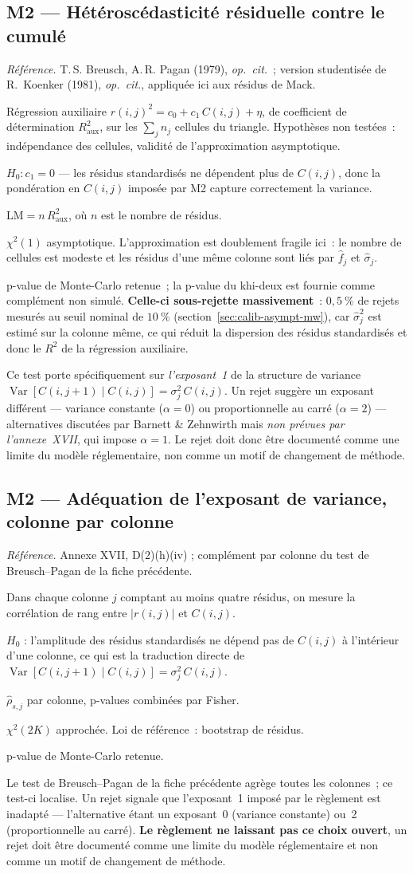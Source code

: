 \documentclass[a4paper,11pt]{article}
\newcommand{\refl}[1]{{\small\textcolor{maincolor!70!black}{\textit{Référence.} #1}}\par\smallskip}
\newcounter{ficheid}
\newenvironment{fiche}[1]{%
  \stepcounter{ficheid}%
  \phantomsection
  \subsection{#1}%
  \label{fiche:\theficheid}%
}{%
  \end{description}\vspace{0.5em}%
}
\newcommand{\Cadre}{%
  \begin{description}[leftmargin=0pt, style=unboxed, itemsep=3pt, topsep=3pt, parsep=2pt]%
  \item[\textcolor{financeblue}{\textbf{1. Cadre, notations et hypothèses de validité (non testées).}}]}
\newcommand{\Hzero}{\item[\textcolor{financeblue}{\textbf{2. Hypothèse nulle.}}]}
\newcommand{\Stat}{\item[\textcolor{financeblue}{\textbf{3. Statistique de test.}}]}
\newcommand{\Loi}{\item[\textcolor{financeblue}{\textbf{4. Loi sous $H_0$.}}]}
\newcommand{\Pval}{\item[\textcolor{financeblue}{\textbf{5. p-value.}}]}
\newcommand{\Usage}{\item[\textcolor{financeblue}{\textbf{6. Usage et limites.}}]}
\begin{document}
\begin{fiche}{M2 --- Hétéroscédasticité résiduelle contre le cumulé}
\label{mw:m2bp}
\refl{T.\,S. Breusch, A.\,R. Pagan (1979), \emph{op.\ cit.}~; version
studentisée de R.~Koenker (1981), \emph{op.\ cit.}, appliquée ici aux résidus de
Mack.}
\Cadre
Régression auxiliaire $r(i,j)^2 = c_0 + c_1\,C(i,j) + \eta$, de coefficient de
détermination $R^2_{\text{aux}}$, sur les $\sum_j n_j$ cellules du triangle.
Hypothèses non testées~: indépendance des cellules, validité de l'approximation
asymptotique.
\Hzero
$H_0 : c_1 = 0$ --- les résidus standardisés ne dépendent plus de $C(i,j)$, donc
la pondération en $C(i,j)$ imposée par M2 capture correctement la variance.
\Stat
$\mathrm{LM} = n\,R^2_{\text{aux}}$, où $n$ est le nombre de résidus.
\Loi
$\chi^2(1)$ asymptotique. L'approximation est doublement fragile ici~: le nombre
de cellules est modeste et les résidus d'une même colonne sont liés par
$\hat f_j$ et $\hat\sigma_j$.
\Pval
p-value de Monte-Carlo retenue~; la p-value du khi-deux est fournie comme
complément non simulé. \textbf{Celle-ci sous-rejette massivement}~: $0{,}5~\%$ de
rejets mesurés au seuil nominal de $10~\%$ (section~\ref{sec:calib-asympt-mw}),
car $\hat\sigma_j^2$ est estimé sur la colonne même, ce qui réduit la dispersion
des résidus standardisés et donc le $R^2$ de la régression auxiliaire.
\Usage
Ce test porte spécifiquement sur \emph{l'exposant~1} de la structure de variance
$\operatorname{Var}[C(i,j+1)\mid C(i,j)] = \sigma_j^2\,C(i,j)$. Un rejet suggère
un exposant différent --- variance constante ($\alpha = 0$) ou proportionnelle au
carré ($\alpha = 2$) --- alternatives discutées par Barnett \& Zehnwirth mais
\emph{non prévues par l'annexe~XVII}, qui impose $\alpha = 1$. Le rejet doit donc
être documenté comme une limite du modèle réglementaire, non comme un motif de
changement de méthode.
\end{fiche}

\begin{fiche}{M2 --- Adéquation de l'exposant de variance, colonne par colonne}
\label{mw:m2b}
\refl{Annexe XVII, D(2)(h)(iv) ; complément par colonne du test de
Breusch--Pagan de la fiche précédente.}
\Cadre
Dans chaque colonne $j$ comptant au moins quatre résidus, on mesure la
corrélation de rang entre $|r(i,j)|$ et $C(i,j)$.
\Hzero
$H_0$ : l'amplitude des résidus standardisés ne dépend pas de $C(i,j)$ à
l'intérieur d'une colonne, ce qui est la traduction directe de
$\operatorname{Var}[C(i,j+1)\mid C(i,j)] = \sigma_j^2\,C(i,j)$.
\Stat
$\hat\rho_{s,j}$ par colonne, p-values combinées par Fisher.
\Loi
$\chi^2(2K)$ approchée. Loi de référence~: bootstrap de résidus.
\Pval
p-value de Monte-Carlo retenue.
\Usage
Le test de Breusch--Pagan de la fiche précédente agrège toutes les colonnes~; ce
test-ci localise. Un rejet signale que l'exposant~1 imposé par le règlement est
inadapté --- l'alternative étant un exposant~0 (variance constante) ou~2
(proportionnelle au carré). \textbf{Le règlement ne laissant pas ce choix
ouvert}, un rejet doit être documenté comme une limite du modèle réglementaire
et non comme un motif de changement de méthode.
\end{fiche}
\end{document}
